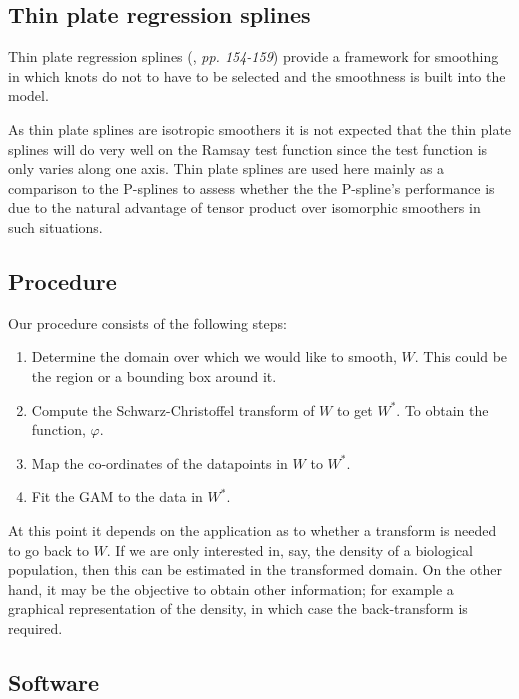 \documentclass[a4paper,10pt]{amsart}
\newcommand{\sch}{Schwarz-Christoffel }
\renewcommand{\phi}{\varphi}
\begin{document}
\subsection{Thin plate regression splines}
Thin plate regression splines (\cite{simonbook}, \emph{pp. 154-159}) provide a framework for smoothing in which knots do not to have to be selected and the smoothness is built into the model.

As thin plate splines are isotropic smoothers it is not expected that the thin plate splines will do very well on the Ramsay test function since the test function is only varies along one axis. Thin plate splines are used here mainly as a comparison to the P-splines to assess whether the the P-spline's performance is due to the natural advantage of tensor product over isomorphic smoothers in such situations.

\subsection{Procedure}

Our procedure consists of the following steps:

\begin{enumerate}
\item Determine the domain over which we would like to smooth, $W$. This could be the region or a bounding box around it.

\item Compute the \sch transform of $W$ to get $W^*$. To obtain the function, $\phi$.

\item Map the co-ordinates of the datapoints in $W$ to $W^*$.

\item Fit the GAM to the data in $W^*$.
\end{enumerate}

At this point it depends on the application as to whether a transform is needed to go back to $W$. If we are only interested in, say, the density of a biological population, then this can be estimated in the transformed domain. On the other hand, it may be the objective to obtain other information; for example a graphical representation of the density, in which case the back-transform is required.

\subsection{Software}
\end{document}
